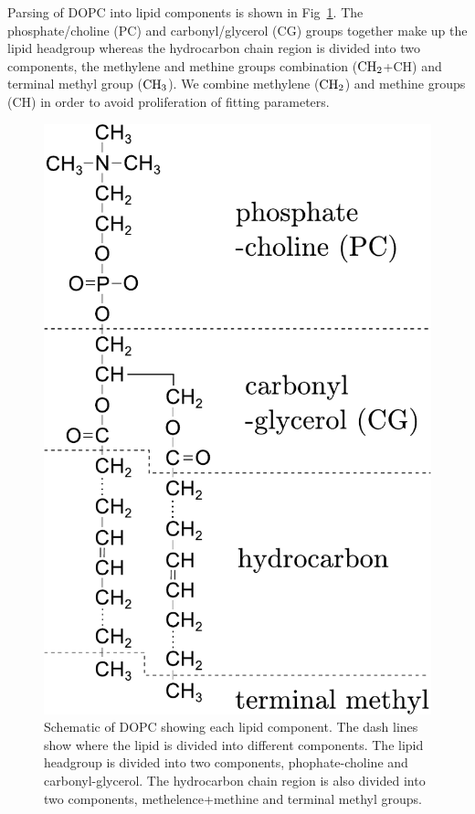 Parsing of DOPC into lipid components is shown in
Fig~\ref{fig:dopc_schematic}. The phosphate/choline (PC) and 
carbonyl/glycerol (CG) groups together make up the lipid headgroup
whereas the hydrocarbon chain region
is divided into two components, the methylene and methine groups 
combination ($\textrm{CH}_2$+CH) and terminal methyl group ($\textrm{CH}_3$). 
We combine methylene ($\textrm{CH}_2$) and methine groups (CH) in order to avoid 
proliferation of 
fitting parameters.
\begin{figure}[htbp]
  \centering
  \includegraphics[scale=0.7]{./figures/Tat/dopc_schematic.pdf}
  \caption{Schematic of DOPC showing each lipid component. The dash lines 
           show where the lipid is divided into different components. 
           The lipid headgroup
           is divided into two components, phophate-choline and carbonyl-glycerol. 
           The hydrocarbon chain region is also divided
           into two components, methelence+methine and terminal methyl groups.}
  \label{fig:dopc_schematic}
\end{figure}

